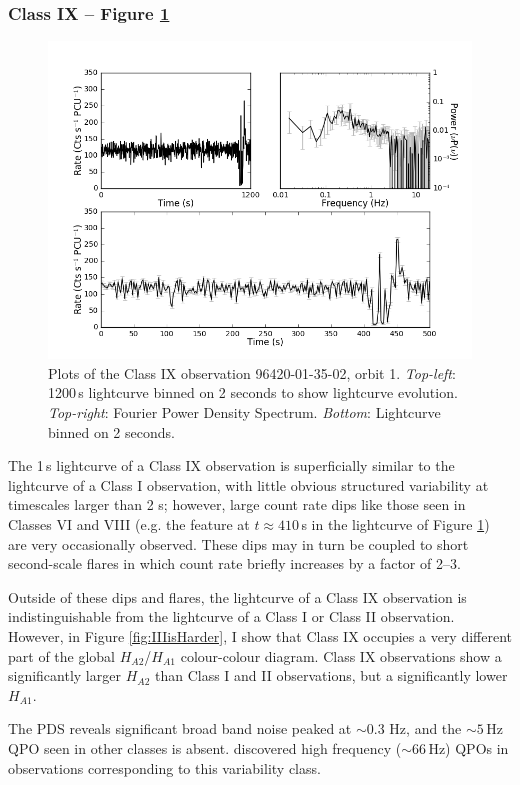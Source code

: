 \subsubsection{Class IX -- Figure \ref{fig:Qmulti}}
\label{sec:ClassIX}
\begin{figure}
    \includegraphics[width=0.8\columnwidth, trim = 0.6cm 0 3.9cm 0]{images/Qmulti.png}
    \captionsetup{singlelinecheck=off}
    \caption[Characteristic lightcurves and a power spectrum of Type IX variability.]{Plots of the Class IX observation 96420-01-35-02, orbit 1.  \textit{Top-left}: 1200\,s lightcurve binned on 2 seconds to show lightcurve evolution.  \textit{Top-right}: Fourier Power Density Spectrum.  \textit{Bottom}: Lightcurve binned on 2 seconds.}
   \label{fig:Qmulti}
\end{figure}

\par The 1\,s lightcurve of a Class IX observation is superficially similar to the lightcurve of a Class I observation, with little obvious structured variability at timescales larger than 2 s; however, large count rate dips like those seen in Classes VI and VIII (e.g. the feature at $t\approx410$\,s in the lightcurve of Figure \ref{fig:Qmulti}) are very occasionally observed.  These dips may in turn be coupled to short second-scale flares in which count rate briefly increases by a factor of 2--3.
\par Outside of these dips and flares, the lightcurve of a Class IX observation is indistinguishable from the lightcurve of a Class I or Class II observation.  However, in Figure \ref{fig:IIIisHarder}, I show that Class IX occupies a very different part of the global $H_{A2}$/$H_{A1}$ colour-colour diagram.  Class IX observations show a significantly larger $H_{A2}$ than Class I and II observations, but a significantly lower $H_{A1}$.
\par The PDS reveals significant broad band noise peaked at $\sim$0.3 Hz, and the $\sim5$\,Hz QPO seen in other classes is absent.  \citet{Altamirano_HFQPO} discovered high frequency ($\sim66$\,Hz) QPOs in observations corresponding to this variability class.

